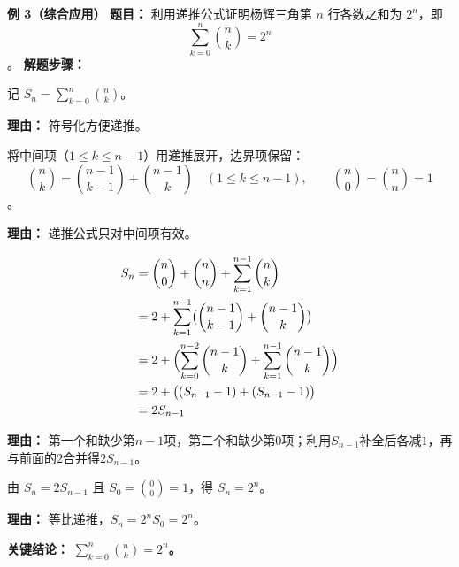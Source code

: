 \begin{examplebox}
	\medskip
	\textbf{\textcolor{CExample}{例 3（综合应用）}}
	\textbf{\textcolor{CExample}{题目：}}
	利用递推公式证明杨辉三角第 $n$ 行各数之和为 $2^n$，即
	\[
		\sum_{k=0}^{n}\binom{n}{k}=2^n
	\]
	。
	\textbf{\textcolor{CExample}{解题步骤：}}
	\begin{description}[style=nextline, leftmargin=2.8em, labelsep=0.5em, itemsep=0.45em]
		\item[\textbf{第一步（引入符号）：}]
			记 $S_n=\sum_{k=0}^{n}\binom{n}{k}$。
			\par\textbf{理由：} 符号化方便递推。
		\item[\textbf{第二步（拆分应用递推）：}]
			将中间项（$1\le k\le n-1$）用递推展开，边界项保留：
			\[
				\binom{n}{k} = \binom{n-1}{k-1}+\binom{n-1}{k}\quad (1\le k\le n-1),
				\qquad
				\binom{n}{0}=\binom{n}{n}=1
			\]
			。
			\par\textbf{理由：} 递推公式只对中间项有效。
		\item[\textbf{第三步（代入求和）：}]
			\[
				\begin{aligned}
					S_n &= \binom{n}{0}+\binom{n}{n}+\sum_{k=1}^{n-1}\binom{n}{k} \\ &= 2+\sum_{k=1}^{n-1}\bigl(\binom{n-1}{k-1}+\binom{n-1}{k}\bigr) \\ &= 2 + \Bigl(\sum_{k=0}^{n-2}\binom{n-1}{k} + \sum_{k=1}^{n-1}\binom{n-1}{k}\Bigr) \\ &= 2 + \bigl( (S_{n-1}-1) + (S_{n-1}-1) \bigr) \\ &= 2S_{n-1}
			\end{aligned}
			\]
			\par\textbf{理由：} 第一个和缺少第$n-1$项，第二个和缺少第$0$项；利用$S_{n-1}$补全后各减$1$，再与前面的$2$合并得$2S_{n-1}$。
		\item[\textbf{第四步（递推求解）：}]
			由 $S_n=2S_{n-1}$ 且 $S_0=\binom{0}{0}=1$，得 $S_n=2^n$。
			\par\textbf{理由：} 等比递推，$S_n=2^nS_0=2^n$。
	\end{description}
	\textbf{\textcolor{CExample}{关键结论：}}
	\textbf{$\displaystyle\sum_{k=0}^{n}\binom{n}{k}=2^n$。}
\end{examplebox}
